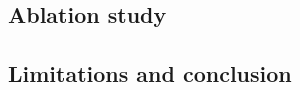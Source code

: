 \subsection{Ablation study}
\label{subsec:results-6}


\subsection{Limitations and conclusion}
\label{subsec:results-7}
